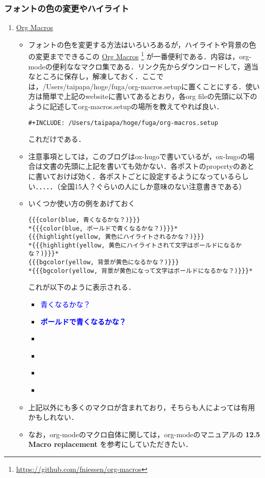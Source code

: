 \documentclass[autodetect-engine,dvipdfmx,12pt,a4paper,ja=standard]{bxjsarticle}
\begin{document}
\subsubsection{フォントの色の変更やハイライト}
\label{sec:org89e68a3}
\begin{enumerate}
\item \href{https://github.com/fniessen/org-macros}{Org Macros}
\label{sec:orged7a6b9}
\begin{itemize}
\item フォントの色を変更する方法はいろいろあるが，ハイライトや背景の色の変更までできるこの \href{https://github.com/fniessen/org-macros}{Org Macros} \footnote{\url{https://github.com/fniessen/org-macros}} が一番便利である．内容は，org-modeの便利ななマクロ集である．リンク先からダウンロードして，適当なところに保存し，解凍しておく．ここでは，/Users/taipapa/hoge/fuga/org-macros.setupに置くことにする．使い方は簡単で上記のwebsiteに書いてあるとおり，各org fileの先頭に以下のように記述してorg-macros.setupの場所を教えてやれば良い．
\begin{verbatim}
#+INCLUDE: /Users/taipapa/hoge/fuga/org-macros.setup
\end{verbatim}
これだけである．
\item 注意事項としては，このブログはox-hugoで書いているが，ox-hugoの場合は文書の先頭に上記を書いても効かない．各ポストのpropertyのあとに書いておけば効く．各ポストごとに設定するようになっているらしい．．．．．（全国15人？ぐらいの人にしか意味のない注意書きである）
\item いくつか使い方の例をあげておく
\begin{verbatim}
{{{color(blue, 青くなるかな？)}}}
*{{{color(blue, ボールドで青くなるかな？)}}}*
{{{highlight(yellow, 黄色にハイライトされるかな？)}}}
*{{{highlight(yellow, 黄色にハイライトされて文字はボールドになるかな？)}}}*
{{{bgcolor(yellow, 背景が黄色になるかな？)}}}
*{{{bgcolor(yellow, 背景が黄色になって文字はボールドになるかな？)}}}*
\end{verbatim}
これが以下のように表示される．
\begin{itemize}
\item \textcolor{blue}{ 青くなるかな？}
\item \textbf{\textcolor{blue}{ ボールドで青くなるかな？}}
\item
\item \textbf{}
\item
\item \textbf{}
\end{itemize}
\item 上記以外にも多くのマクロが含まれており，そちらも人によっては有用かもしれない．
\item なお，org-modeのマクロ自体に関しては，org-modeのマニュアルの \textbf{12.5 Macro replacement} を参考にしていただきたい．
\end{itemize}
\end{enumerate}
\end{document}
